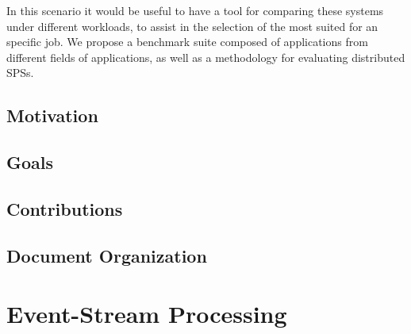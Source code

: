 \documentclass[ppgc,diss,english]{iiufrgs}
\begin{document}
In this scenario it would be useful to have a tool for comparing these systems under different workloads, to assist in the selection of the most suited for an specific job. We propose a benchmark suite composed of applications from different fields of applications, as well as a methodology for evaluating distributed SPSs.

\section{Motivation}

\section{Goals}

\section{Contributions}

\section{Document Organization}


\chapter{Event-Stream Processing}

%
%
\end{document}

